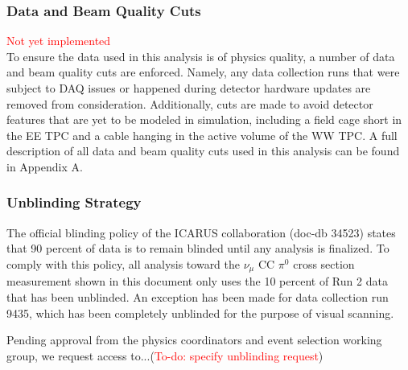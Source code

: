 \documentclass[../main.tex]{subfiles}
\begin{document}
\subsubsection{Data and Beam Quality Cuts}
\textcolor{red}{Not yet implemented}\\
To ensure the data used in this analysis is of physics quality, a number of data and beam quality cuts are enforced.  Namely, any data collection runs that were subject to DAQ issues or happened during detector hardware updates are removed from consideration.  Additionally, cuts are made to avoid detector features that are yet to be modeled in simulation, including a field cage short in the EE TPC and a cable hanging in the active volume of the WW TPC.  A full description of all data and beam quality cuts used in this analysis can be found in Appendix A.

\subsubsection{Unblinding Strategy}
The official blinding policy of the ICARUS collaboration (doc-db 34523) states that 90 percent of data is to remain blinded until any analysis is finalized.  To comply with this policy, all analysis toward the $\nu_{\mu}$ CC $\pi^{0}$ cross section measurement shown in this document only uses the 10 percent of Run 2 data that has been unblinded.  An exception has been made for data collection run 9435, which has been completely unblinded for the purpose of visual scanning.

Pending approval from the physics coordinators and event selection working group, we request access to...(\textcolor{red}{To-do: specify unblinding request})
\end{document}
